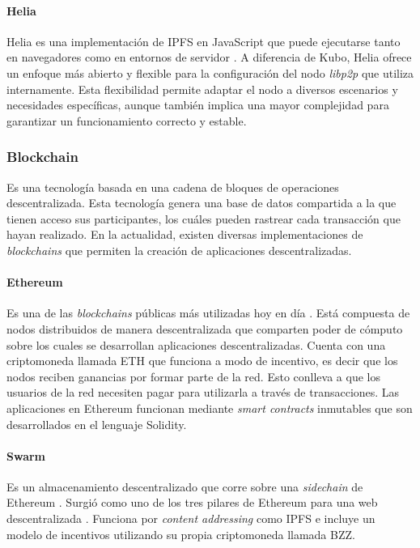 \paragraph{Helia}
Helia es una implementación de IPFS en JavaScript que puede ejecutarse tanto en navegadores como en entornos de servidor \cite{helia}. A diferencia de Kubo, Helia ofrece un enfoque más abierto y flexible para la configuración del nodo \textit{libp2p} que utiliza internamente. Esta flexibilidad permite adaptar el nodo a diversos escenarios y necesidades específicas, aunque también implica una mayor complejidad para garantizar un funcionamiento correcto y estable.

\subsubsection{Blockchain}

Es una tecnología basada en una cadena de bloques de operaciones descentralizada.  Esta tecnología genera una base de datos compartida a la que tienen acceso sus participantes, los cuáles pueden rastrear cada transacción que hayan realizado. En la actualidad, existen diversas implementaciones de \textit{blockchains} que permiten la creación de aplicaciones descentralizadas.

\paragraph{Ethereum} Es una de las \textit{blockchains} públicas más utilizadas hoy en día \cite{wood2014ethereum}. Está compuesta de nodos distribuidos de manera descentralizada que comparten poder de cómputo sobre los cuales se desarrollan aplicaciones descentralizadas. Cuenta con una criptomoneda llamada ETH que funciona a modo de incentivo, es decir que los nodos reciben ganancias por formar parte de la red. Esto conlleva a que los usuarios de la red necesiten pagar para utilizarla a través de transacciones. Las aplicaciones en Ethereum funcionan mediante \textit{smart contracts} inmutables que son desarrollados en el lenguaje Solidity.

\paragraph{Swarm} Es un almacenamiento descentralizado que corre sobre una \textit{sidechain} de Ethereum \cite{team2021swarm}. Surgió como uno de los tres pilares de Ethereum para una web descentralizada \parencite{swarm-origin}. Funciona por \textit{content addressing} como IPFS e incluye un modelo de incentivos utilizando su propia criptomoneda llamada BZZ.

